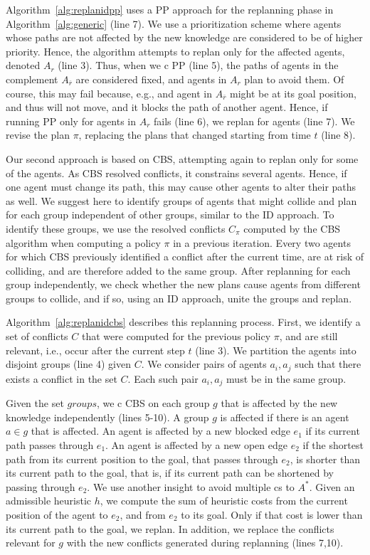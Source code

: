 \documentclass[letterpaper]{article} %
\def\
UrlFont{\rm}  %
\theoremstyle{definition}
\begin{document}
Algorithm~\ref{alg:replanidpp} uses a PP approach for the replanning phase in Algorithm~\ref{alg:generic} (line 7). We use a prioritization scheme where agents whose paths are not affected by the new knowledge are considered to be of higher priority. Hence, the algorithm attempts to replan only for the affected agents, denoted $A_r$ (line 3). Thus, when we c PP (line 5), the paths of agents in the complement $A_{\overline{r}}$ are considered fixed, and agents in $A_r$ plan to avoid them. Of course, this may fail because, e.g., and agent in $A_{\overline{r}}$ might be at its goal position, and thus will not move, and it blocks the path of another agent. Hence, if running PP only for agents in $A_r$ fails (line 6), we replan for  agents (line 7). We revise the plan $\pi$, replacing the plans that changed starting from time $t$ (line 8).

Our second approach is based on CBS, attempting again to replan only for some of the agents. As CBS resolved conflicts, it constrains several agents. Hence, if one agent must change its path, this may cause other agents to alter their paths as well.
We suggest here to identify groups of agents that might collide and plan for each group independent of other groups, similar to the ID approach. To identify these groups, we use the resolved conflicts $C_\pi$ computed by the CBS algorithm when computing a policy $\pi$ in a previous iteration. Every two agents for which CBS previously identified a conflict after the current time, are at risk of colliding, and are therefore added to the same group.
After replanning for each group independently, we check whether the new plans cause agents from different groups to collide, and if so, using an ID approach, unite the groups and replan.

Algorithm~\ref{alg:replanidcbs} describes this replanning process. First, we identify a set of conflicts $C$ that were computed for the previous policy $\pi$, and are still relevant, i.e., occur after the current step $t$ (line 3). We partition the agents into disjoint groups (line 4) given $C$. We consider pairs of agents $a_i,a_j$ such that there exists a conflict in the set $C$. Each such pair $a_i,a_j$ must be in the same group.

Given the set $groups$, we c CBS on each group $g$ that is affected by the new knowledge independently (lines 5-10). A group $g$ is affected if there is an agent $a \in g$ that is affected. An agent is affected by a new blocked edge $e_1$ if its current path passes through $e_1$. An agent is affected by a new open edge $e_2$ if the shortest path from its current position to the goal, that passes through $e_2$, is shorter than its current path to the goal, that is, if its current path can be shortened by passing through $e_2$. We use another insight to avoid multiple cs to $A^*$. Given an admissible heuristic $h$, we compute the sum of heuristic costs from the current position of the agent to $e_2$, and from $e_2$ to its goal. Only if that cost is lower than its current path to the goal, we replan. In addition, we replace the conflicts relevant for $g$ with the new conflicts generated during replanning (lines 7,10).
\end{document}
